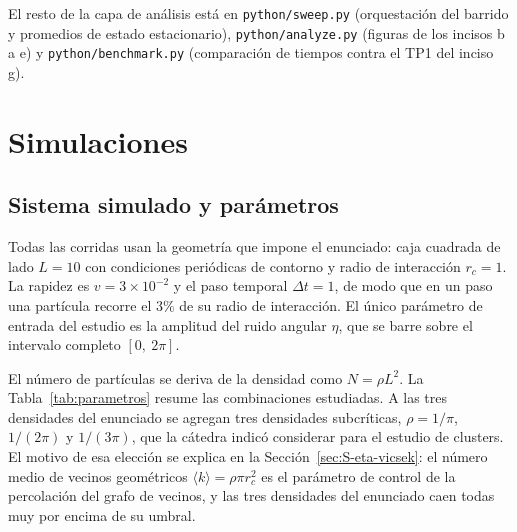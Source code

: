 \documentclass[11pt]{article}
\begin{document}
El resto de la capa de análisis está en \texttt{python/sweep.py} (orquestación
del barrido y promedios de estado estacionario), \texttt{python/analyze.py}
(figuras de los incisos b a e) y \texttt{python/benchmark.py} (comparación de
tiempos contra el TP1 del inciso g).

\section{Simulaciones}
\label{sec:simulaciones}

\subsection{Sistema simulado y parámetros}
\label{sec:parametros}

Todas las corridas usan la geometría que impone el enunciado: caja cuadrada de
lado $L = 10$ con condiciones periódicas de contorno y radio de interacción
$r_c = 1$. La rapidez es $v = 3\times10^{-2}$ y el paso temporal $\Delta t = 1$,
de modo que en un paso una partícula recorre el $3\%$ de su radio de
interacción. El único parámetro de entrada del estudio es la amplitud del ruido
angular $\eta$, que se barre sobre el intervalo completo $[0,\ 2\pi]$.

El número de partículas se deriva de la densidad como $N = \rho L^2$. La
Tabla~\ref{tab:parametros} resume las combinaciones estudiadas. A las tres
densidades del enunciado se agregan tres densidades subcríticas,
$\rho = 1/\pi$, $1/(2\pi)$ y $1/(3\pi)$, que la cátedra indicó considerar para
el estudio de clusters. El motivo de esa elección se explica en la
Sección~\ref{sec:S-eta-vicsek}: el número medio de vecinos geométricos
$\langle k \rangle = \rho \pi r_c^2$ es el parámetro de control de la
percolación del grafo de vecinos, y las tres densidades del enunciado caen todas
muy por encima de su umbral.
\end{document}
